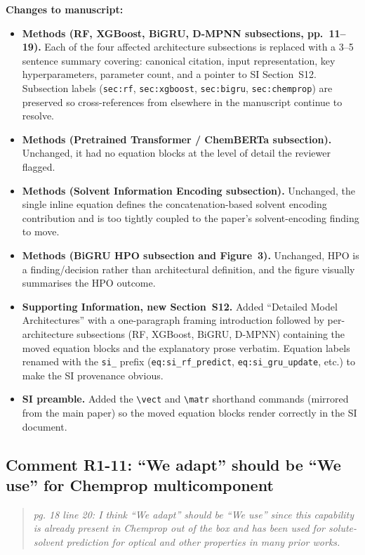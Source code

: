 \documentclass[11pt]{article}
\newenvironment{reviewer}{%
  \begin{quote}\itshape\color{black!70}}{%
  \end{quote}}
\newenvironment{changes}{%
  \noindent\textbf{Changes to manuscript:}
  \begin{itemize}[leftmargin=2em,itemsep=2pt]}{%
  \end{itemize}\medskip}
\begin{document}
\begin{changes}
  \item \textbf{Methods (RF, XGBoost, BiGRU, D-MPNN subsections, pp.\ 11--19).} Each of the four affected architecture subsections is replaced with a 3--5 sentence summary covering: canonical citation, input representation, key hyperparameters, parameter count, and a pointer to SI Section~S12. Subsection labels (\texttt{sec:rf}, \texttt{sec:xgboost}, \texttt{sec:bigru}, \texttt{sec:chemprop}) are preserved so cross-references from elsewhere in the manuscript continue to resolve.
  \item \textbf{Methods (Pretrained Transformer / ChemBERTa subsection).} Unchanged, it had no equation blocks at the level of detail the reviewer flagged.
  \item \textbf{Methods (Solvent Information Encoding subsection).} Unchanged, the single inline equation defines the concatenation-based solvent encoding contribution and is too tightly coupled to the paper's solvent-encoding finding to move.
  \item \textbf{Methods (BiGRU HPO subsection and Figure~3).} Unchanged, HPO is a finding/decision rather than architectural definition, and the figure visually summarises the HPO outcome.
  \item \textbf{Supporting Information, new Section~S12.} Added ``Detailed Model Architectures'' with a one-paragraph framing introduction followed by per-architecture subsections (RF, XGBoost, BiGRU, D-MPNN) containing the moved equation blocks and the explanatory prose verbatim. Equation labels renamed with the \texttt{si\_} prefix (\texttt{eq:si\_rf\_predict}, \texttt{eq:si\_gru\_update}, etc.) to make the SI provenance obvious.
  \item \textbf{SI preamble.} Added the \texttt{\textbackslash vect} and \texttt{\textbackslash matr} shorthand commands (mirrored from the main paper) so the moved equation blocks render correctly in the SI document.
\end{changes}

\subsection*{Comment R1-11: ``We adapt'' should be ``We use'' for Chemprop multicomponent}
\begin{reviewer}
pg. 18 line 20: I think ``We adapt'' should be ``We use'' since this capability is already present in Chemprop out of the box and has been used for solute-solvent prediction for optical and other properties in many prior works.
\end{reviewer}
\end{document}
